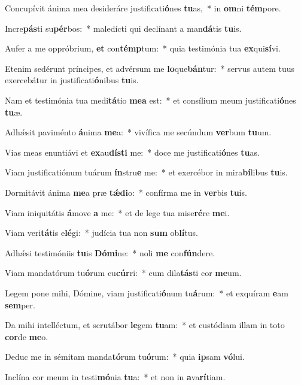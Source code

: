 \item Concupívit ánima mea desideráre justificati\textbf{ó}nes \textbf{tu}as,~* in \textbf{om}ni \textbf{tém}pore.
\item Incre\textbf{pás}ti su\textbf{pér}bos:~* maledícti qui declínant a man\textbf{dá}tis \textbf{tu}is.
\item Aufer a me oppróbrium, \textbf{et} con\textbf{témp}tum:~* quia testimónia tua \textbf{ex}qui\textbf{sí}vi.
\item Etenim sedérunt príncipes, et advérsum me \textbf{lo}que\textbf{bán}tur:~* servus autem tuus exercebátur in justificati\textbf{ó}nibus \textbf{tu}is.
\item Nam et testimónia tua medi\textbf{tá}tio \textbf{me}\textbf{a} est:~* et consílium meum justificati\textbf{ó}nes \textbf{tu}æ.
\item Adhǽsit paviménto \textbf{á}nima \textbf{me}a:~* vivífica me secúndum \textbf{ver}bum \textbf{tu}um.
\item Vias meas enuntiávi et \textbf{ex}au\textbf{dís}\textbf{ti} me:~* doce me justificati\textbf{ó}nes \textbf{tu}as.
\item Viam justificatiónum tuárum \textbf{ín}stru\textbf{e} me:~* et exercébor in mira\textbf{bí}libus \textbf{tu}is.
\item Dormitávit ánima \textbf{me}a præ \textbf{tǽ}\textbf{di}o:~* confírma me in \textbf{ver}bis \textbf{tu}is.
\item Viam iniquitátis \textbf{á}move \textbf{a} me:~* et de lege tua mise\textbf{ré}re \textbf{me}i.
\item Viam veri\textbf{tá}tis e\textbf{lé}gi:~* judícia tua non \textbf{sum} ob\textbf{lí}tus.
\item Adhǽsi testimóniis \textbf{tu}is \textbf{Dó}\textbf{mi}ne:~* noli \textbf{me} con\textbf{fún}dere.
\item Viam mandatórum tu\textbf{ó}rum cu\textbf{cúr}ri:~* cum dila\textbf{tás}ti cor \textbf{me}um.
\item Legem pone mihi, Dómine, viam justificati\textbf{ó}num tu\textbf{á}rum:~* et exquíram \textbf{e}am \textbf{sem}per.
\item Da mihi intelléctum, et scrutábor \textbf{le}gem \textbf{tu}am:~* et custódiam illam in toto \textbf{cor}de \textbf{me}o.
\item Deduc me in sémitam manda\textbf{tó}rum tu\textbf{ó}rum:~* quia \textbf{ip}sam \textbf{vó}lui.
\item Inclína cor meum in testi\textbf{mó}nia \textbf{tu}a:~* et non in \textbf{a}va\textbf{rí}tiam.
